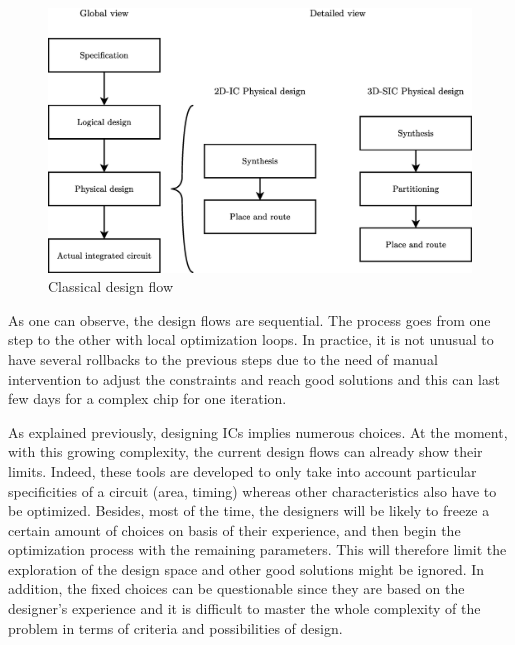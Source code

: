 \begin{figure}[h!]
\begin{center}
\includegraphics[width=\linewidth]{designflow2.eps}
\end{center}
\vspace{-0.5cm}
\caption{Classical design flow}
\label{fig:designflow}
\end{figure}

As one can observe, the design flows are sequential. The process goes from one step to the other with local optimization loops. In practice, it is not unusual to have several rollbacks to the previous steps due to the need of manual intervention to adjust the constraints and reach good solutions and this can last few days for a complex chip for one iteration. %

As explained previously, designing ICs implies numerous choices. At the moment, with this growing complexity, the current design flows can already show their limits. Indeed, these tools are developed to only take into account particular specificities of a circuit (area, timing) whereas other characteristics also have to be optimized. Besides, most of the time, the designers will be likely to freeze a certain amount of choices on basis of their experience, and then begin the optimization process with the remaining parameters. This will therefore limit the exploration of the design space and other good solutions might be ignored. In addition, the fixed choices can be questionable since they are based on the designer's experience and it is difficult to master the whole complexity of the problem in terms of criteria and possibilities of design.

